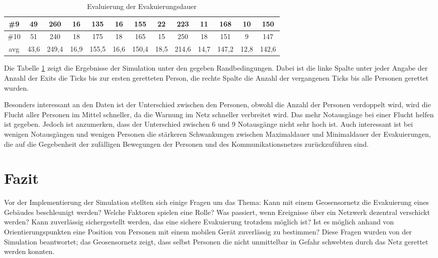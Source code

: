 \begin{table}[h]
\begin{tabular}{c|c|c|c|c|c|c|c|c|c|c|c|c|}
\multicolumn{1}{|c|}{\#9}  & 49           & 260           & 16           & 135           & 16           & 155           & 22           & 223           & 11           & 168           & 10            & 150           \\ \hline
\multicolumn{1}{|c|}{\#10} & 51           & 240           & 18           & 175           & 18           & 165           & 15           & 250           & 18           & 151           & 9             & 147           \\ \hline
\multicolumn{1}{|c|}{avg}  & 43,6         & 249,4         & 16,9         & 155,5         & 16,6         & 150,4         & 18,5         & 214,6         & 14,7         & 147,2         & 12,8          & 142,6         \\ \hline
\end{tabular}
\caption{Evaluierung der Evakuierungsdauer}
\label{fig:data}
\end{table}

Die Tabelle \ref{fig:data} zeigt die Ergebnisse der Simulation unter den gegeben Randbedingungen. Dabei ist die linke Spalte unter jeder Angabe der Anzahl der Exits die Ticks bis zur ersten geretteten Person, die rechte Spalte die Anzahl der vergangenen Ticks bis alle Personen gerettet wurden.

Besonders interessant an den Daten ist der Unterschied zwischen den Personen, obwohl die Anzahl der Personen verdoppelt wird, wird die Flucht aller Personen im Mittel schneller, da die Warnung im Netz schneller verbreitet wird. Das mehr Notausgänge bei einer Flucht helfen ist gegeben. Jedoch ist anzumerken, dass der Unterschied zwischen 6 und 9 Notausgänge nicht sehr hoch ist. Auch interessant ist bei wenigen Notausgängen und wenigen Personen die stärkeren Schwankungen zwischen Maximaldauer und Minimaldauer der Evakuierungen, die auf die Gegebenheit der zufälligen Bewegungen der Personen und des Kommunikationsnetzes zurückzuführen sind.

\section{Fazit}

Vor der Implementierung der Simulation stellten sich einige Fragen um das Thema: Kann mit einem Geosensornetz die Evakuierung eines Gebäudes beschleunigt werden? Welche Faktoren spielen eine Rolle? Was passiert, wenn Ereignisse über ein Netzwerk dezentral verschickt werden? Kann zuverlässig sichergestellt werden, das eine sichere Evakuierung trotzdem möglich ist? Ist es möglich anhand von Orientierungspunkten eine Position von Personen mit einem mobilen Gerät zuverlässig zu bestimmen? Diese Fragen wurden von der Simulation beantwortet; das Geosensornetz zeigt, dass selbst Personen die nicht unmittelbar in Gefahr schwebten durch das Netz gerettet werden konnten.

